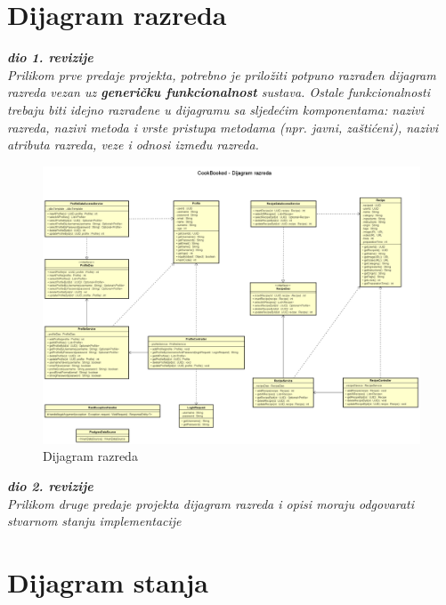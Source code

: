 			\eject
			
			
		\section{Dijagram razreda}
			
			\textbf{\textit{dio 1. revizije}}\\
			
			\textit{Prilikom prve predaje projekta, potrebno je priložiti potpuno razrađen dijagram razreda vezan uz \textbf{generičku funkcionalnost} sustava. Ostale funkcionalnosti trebaju biti idejno razrađene u dijagramu sa sljedećim komponentama: nazivi razreda, nazivi metoda i vrste pristupa metodama (npr. javni, zaštićeni), nazivi atributa razreda, veze i odnosi između razreda.}\\

\begin{figure}[H]
			    \centering
			    \includegraphics[width=1\linewidth]{slike//dijagrami/Dijagram razreda.png}
			    \caption{Dijagram razreda}
			    \label{fig:enter-label}
			\end{figure}
	\eject		
   \textbf{\textit{dio 2. revizije}}\\			
			
			\textit{Prilikom druge predaje projekta dijagram razreda i opisi moraju odgovarati stvarnom stanju implementacije}
			
			
			
			\eject
		
		\section{Dijagram stanja}
			
